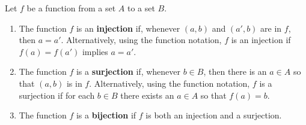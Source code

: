 \begin{definition} Let $f$ be a function from a set $A$ to a set $B$. 
\begin{enumerate}
\item The function $f$ is an \textbf{injection} if, whenever $(a,b)$ and $(a',b)$ are in $f$, then $a=a'$. Alternatively, using the function notation, $f$ is an injection if $f(a)=f(a')$ implies $a=a'$. 
\item The function $f$ is a \textbf{surjection} if, whenever $b \in B$, then there is an $a \in A$ so that $(a,b)$ is in $f$.  Alternatively, using the function notation, $f$ is a surjection if for each $b \in B$ there exists an $a \in A$ so that $f(a)=b$. 
\item The function $f$ is a \textbf{bijection} if $f$ is both an injection and a surjection. 
\end{enumerate}
\end{definition}


